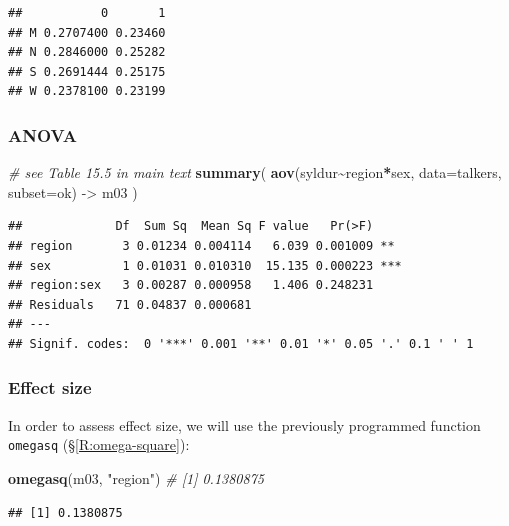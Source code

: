 \documentclass[
]{book}
\newenvironment{Shaded}{\begin{snugshade}}{\end{snugshade}}
\newcommand{\CommentTok}[1]{\textcolor[rgb]{0.56,0.35,0.01}{\textit{#1}}}
\newcommand{\DataTypeTok}[1]{\textcolor[rgb]{0.13,0.29,0.53}{#1}}
\newcommand{\KeywordTok}[1]{\textcolor[rgb]{0.13,0.29,0.53}{\textbf{#1}}}
\newcommand{\NormalTok}[1]{#1}
\newcommand{\OperatorTok}[1]{\textcolor[rgb]{0.81,0.36,0.00}{\textbf{#1}}}
\newcommand{\StringTok}[1]{\textcolor[rgb]{0.31,0.60,0.02}{#1}}
\begin{document}
\begin{verbatim}
##           0       1
## M 0.2707400 0.23460
## N 0.2846000 0.25282
## S 0.2691444 0.25175
## W 0.2378100 0.23199
\end{verbatim}

\hypertarget{anova-3}{%
\subsubsection{ANOVA}\label{anova-3}}

\begin{Shaded}
\begin{Highlighting}[]
\CommentTok{\# see Table 15.5 in main text}
\KeywordTok{summary}\NormalTok{( }\KeywordTok{aov}\NormalTok{(syldur}\OperatorTok{\textasciitilde{}}\NormalTok{region}\OperatorTok{*}\NormalTok{sex, }\DataTypeTok{data=}\NormalTok{talkers, }\DataTypeTok{subset=}\NormalTok{ok) {-}\textgreater{}}\StringTok{ }\NormalTok{m03 )}
\end{Highlighting}
\end{Shaded}

\begin{verbatim}
##             Df  Sum Sq  Mean Sq F value   Pr(>F)    
## region       3 0.01234 0.004114   6.039 0.001009 ** 
## sex          1 0.01031 0.010310  15.135 0.000223 ***
## region:sex   3 0.00287 0.000958   1.406 0.248231    
## Residuals   71 0.04837 0.000681                     
## ---
## Signif. codes:  0 '***' 0.001 '**' 0.01 '*' 0.05 '.' 0.1 ' ' 1
\end{verbatim}

\hypertarget{effectsize}{%
\subsubsection{Effect size}\label{effectsize}}

In order to assess effect size, we will use the previously programmed function \texttt{omegasq}
(§\ref{R:omega-square}):

\begin{Shaded}
\begin{Highlighting}[]
\KeywordTok{omegasq}\NormalTok{(m03, }\StringTok{"region"}\NormalTok{)      }\CommentTok{\# [1] 0.1380875}
\end{Highlighting}
\end{Shaded}

\begin{verbatim}
## [1] 0.1380875
\end{verbatim}
\end{document}
